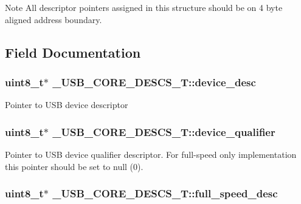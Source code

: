 \begin{DoxyNote}{Note}
All descriptor pointers assigned in this structure should be on 4 byte aligned address boundary. 
\end{DoxyNote}


\subsection{Field Documentation}
\hypertarget{struct__USB__CORE__DESCS__T_a15c6d25f9b77c7034439715d769f20f3}{
\subsubsection[{device\-\_\-desc}]{\setlength{\rightskip}{0pt plus 5cm}uint8\-\_\-t$\ast$ \-\_\-\-U\-S\-B\-\_\-\-C\-O\-R\-E\-\_\-\-D\-E\-S\-C\-S\-\_\-\-T\-::device\-\_\-desc}}\label{struct__USB__CORE__DESCS__T_a15c6d25f9b77c7034439715d769f20f3}
Pointer to U\-S\-B device descriptor \hypertarget{struct__USB__CORE__DESCS__T_aec1cd64157ed8c38c31b561f6857e6cf}{
\subsubsection[{device\-\_\-qualifier}]{\setlength{\rightskip}{0pt plus 5cm}uint8\-\_\-t$\ast$ \-\_\-\-U\-S\-B\-\_\-\-C\-O\-R\-E\-\_\-\-D\-E\-S\-C\-S\-\_\-\-T\-::device\-\_\-qualifier}}\label{struct__USB__CORE__DESCS__T_aec1cd64157ed8c38c31b561f6857e6cf}
Pointer to U\-S\-B device qualifier descriptor. For full-\/speed only implementation this pointer should be set to null (0). \hypertarget{struct__USB__CORE__DESCS__T_adc04768aaa60355fd9934895955b7439}{
\subsubsection[{full\-\_\-speed\-\_\-desc}]{\setlength{\rightskip}{0pt plus 5cm}uint8\-\_\-t$\ast$ \-\_\-\-U\-S\-B\-\_\-\-C\-O\-R\-E\-\_\-\-D\-E\-S\-C\-S\-\_\-\-T\-::full\-\_\-speed\-\_\-desc}}\label{struct__USB__CORE__DESCS__T_adc04768aaa60355fd9934895955b7439}
